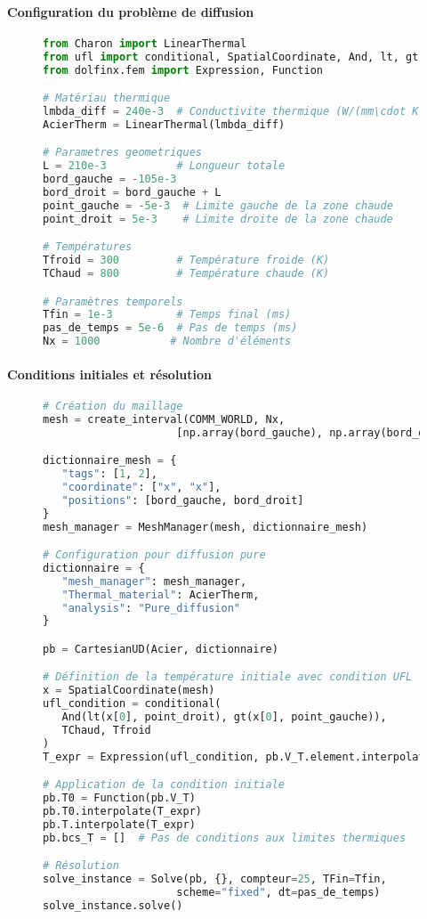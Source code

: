 \documentclass[10pt]{book}
\begin{document}
\paragraph{Configuration du problème de diffusion}

\begin{figure}[h!]
\begin{lstlisting}[language=python]
from Charon import LinearThermal
from ufl import conditional, SpatialCoordinate, And, lt, gt
from dolfinx.fem import Expression, Function

# Matériau thermique
lmbda_diff = 240e-3  # Conductivite thermique (W/(mm\cdot K))
AcierTherm = LinearThermal(lmbda_diff)

# Parametres geometriques
L = 210e-3           # Longueur totale
bord_gauche = -105e-3
bord_droit = bord_gauche + L
point_gauche = -5e-3  # Limite gauche de la zone chaude
point_droit = 5e-3    # Limite droite de la zone chaude

# Températures
Tfroid = 300         # Température froide (K)
TChaud = 800         # Température chaude (K)

# Paramètres temporels
Tfin = 1e-3          # Temps final (ms)
pas_de_temps = 5e-6  # Pas de temps (ms)
Nx = 1000           # Nombre d'éléments
\end{lstlisting}
\end{figure}

\paragraph{Conditions initiales et résolution}

\begin{figure}[h!]
\begin{lstlisting}[language=python]
# Création du maillage
mesh = create_interval(COMM_WORLD, Nx, 
                     [np.array(bord_gauche), np.array(bord_droit)])

dictionnaire_mesh = {
   "tags": [1, 2], 
   "coordinate": ["x", "x"], 
   "positions": [bord_gauche, bord_droit]
}
mesh_manager = MeshManager(mesh, dictionnaire_mesh)

# Configuration pour diffusion pure
dictionnaire = {
   "mesh_manager": mesh_manager,
   "Thermal_material": AcierTherm, 
   "analysis": "Pure_diffusion"
}

pb = CartesianUD(Acier, dictionnaire)

# Définition de la température initiale avec condition UFL
x = SpatialCoordinate(mesh)
ufl_condition = conditional(
   And(lt(x[0], point_droit), gt(x[0], point_gauche)), 
   TChaud, Tfroid
)
T_expr = Expression(ufl_condition, pb.V_T.element.interpolation_points())

# Application de la condition initiale
pb.T0 = Function(pb.V_T)
pb.T0.interpolate(T_expr)
pb.T.interpolate(T_expr)
pb.bcs_T = []  # Pas de conditions aux limites thermiques

# Résolution
solve_instance = Solve(pb, {}, compteur=25, TFin=Tfin, 
                     scheme="fixed", dt=pas_de_temps)
solve_instance.solve()
\end{lstlisting}
\end{figure}
\end{document}
